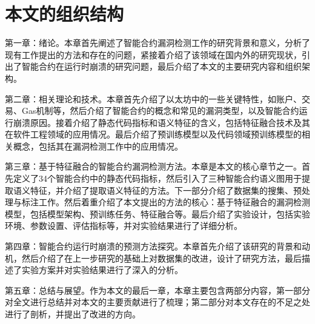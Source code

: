 \section{本文的组织结构}
\label{sec:本文的组织结构}
第一章：绪论。本章首先阐述了智能合约漏洞检测工作的研究背景和意义，分析了现有工作提出的方法和存在的问题，紧接着介绍了该领域在国内外的研究现状，引出了智能合约在运行时崩溃的研究问题，最后介绍了本文的主要研究内容和组织架构。


第二章：相关理论和技术。本章首先介绍了以太坊中的一些关键特性，如账户、交易、Gas机制等，然后介绍了智能合约的概念和常见的漏洞类型，以及智能合约运行崩溃原因。接着介绍了静态代码指标和语义特征的含义，包括特征融合技术及其在软件工程领域的应用情况。最后介绍了预训练模型以及代码领域预训练模型的相关概念，包括其在漏洞检测工作中的应用情况。

第三章：基于特征融合的智能合约漏洞检测方法。本章是本文的核心章节之一。首先定义了34个智能合约中的静态代码指标，然后引入了三种智能合约语义图用于提取语义特征，并介绍了提取语义特征的方法。下一部分介绍了数据集的搜集、预处理与标注工作。然后着重介绍了本文提出的方法的核心：基于特征融合的漏洞检测模型，包括模型架构、预训练任务、特征融合等。最后介绍了实验设计，包括实验环境、参数设置、评估指标等，并对实验结果进行了详细分析。

第四章：智能合约运行时崩溃的预测方法探究。本章首先介绍了该研究的背景和动机，然后介绍了在上一步研究的基础上对数据集的改进，设计了研究方法，最后描述了实验方案并对实验结果进行了深入的分析。

第五章：总结与展望。作为本文的最后一章，本章主要包含两部分内容，第一部分对全文进行总结并对本文的主要贡献进行了梳理；第二部分对本文存在的不足之处进行了剖析，并提出了改进的方向。

